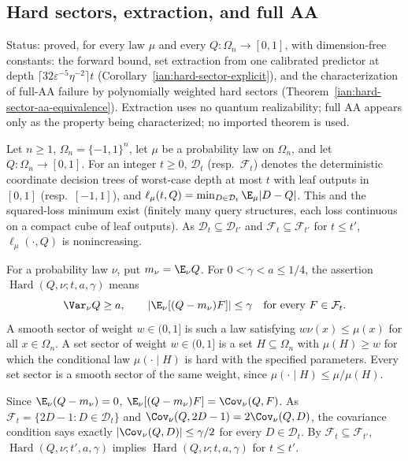 \subsection{Hard sectors, extraction, and full AA}\label{ian:hard-sector-definitions-forward}

Status: proved, for every law \(\mu\) and every \(Q:\Omega_n\to[0,1]\), with dimension-free constants: the forward bound, set extraction from one calibrated predictor at depth \(\lceil32\varepsilon^{-5}\eta^{-2}\rceil t\) (Corollary~\ref{ian:hard-sector-explicit}), and the characterization of full-AA failure by polynomially weighted hard sectors (Theorem~\ref{ian:hard-sector-aa-equivalence}). Extraction uses no quantum realizability; full AA appears only as the property being characterized; no imported theorem is used.

Let \(n\ge1\), \(\Omega_n=\{-1,1\}^n\), let \(\mu\) be a probability law on \(\Omega_n\), and let
\(Q:\Omega_n\to[0,1]\). For an integer \(t\ge0\), \(\mathcal D_t\) (resp.\ \(\mathcal F_t\)) denotes the
deterministic coordinate decision trees of worst-case depth at most \(t\) with leaf outputs in \([0,1]\) (resp.\
\([-1,1]\)), and \(\ell_\mu(t,Q)=\min_{D\in\mathcal D_t}\E_\mu|D-Q|\). This and the squared-loss minimum exist
(finitely many query structures, each loss continuous on a compact cube of leaf outputs). As \(\mathcal
D_t\subseteq\mathcal D_{t'}\) and \(\mathcal F_t\subseteq\mathcal F_{t'}\) for \(t\le t'\),
\(\ell_\mu(\cdot,Q)\) is nonincreasing.

\begin{definition}\label{ian:hard-sector-definition}
For a probability law \(\nu\), put \(m_\nu=\E_\nu Q\). For \(0<\gamma<a\le1/4\), the assertion
\(\operatorname{Hard}(Q,\nu;t,a,\gamma)\) means
\[
 \Var_\nu Q\ge a,\qquad\left|\E_\nu[(Q-m_\nu)F]\right|\le\gamma\quad\text{for every }F\in\mathcal F_t.
\]
A smooth sector of weight \(w\in(0,1]\) is such a law satisfying \(w\nu(x)\le\mu(x)\) for all \(x\in\Omega_n\).
A set sector of weight \(w\in(0,1]\) is a set \(H\subseteq\Omega_n\) with \(\mu(H)\ge w\) for which the
conditional law \(\mu(\cdot\mid H)\) is hard with the specified parameters. Every set sector is a smooth sector
of the same weight, since \(\mu(\cdot\mid H)\le\mu/\mu(H)\).
\end{definition}

Since \(\E_\nu(Q-m_\nu)=0\), \(\E_\nu[(Q-m_\nu)F]=\Cov_\nu(Q,F)\). As \(\mathcal F_t=\{2D-1:D\in\mathcal D_t\}\)
and \(\Cov_\nu(Q,2D-1)=2\Cov_\nu(Q,D)\), the covariance condition says exactly \(|\Cov_\nu(Q,D)|\le\gamma/2\)
for every \(D\in\mathcal D_t\). By \(\mathcal F_t\subseteq\mathcal F_{t'}\),
\(\operatorname{Hard}(Q,\nu;t',a,\gamma)\) implies \(\operatorname{Hard}(Q,\nu;t,a,\gamma)\) for \(t\le t'\).

